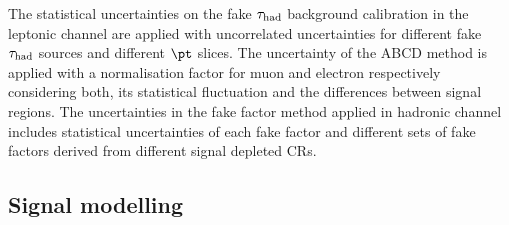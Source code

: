 \documentclass[PAPER, coverpage, atlasdraft=true, texlive=2016, UKenglish]{\ATLASLATEXPATH atlasdoc}
\providecommand{\DIFadd}[1]{{\protect\color{blue}\uwave{#1}}} %
\providecommand{\DIFdel}[1]{{\protect\color{red}\sout{#1}}}                      %
\providecommand{\DIFaddbegin}{} %
\providecommand{\DIFaddend}{} %
\providecommand{\DIFdelbegin}{} %
\providecommand{\DIFdelend}{} %
\begin{document}




The statistical uncertainties on the fake \DIFdelbegin \DIFdel{$\tau_{\mathrm{had}}$ }\DIFdelend \DIFaddbegin \DIFadd{tau }\DIFaddend background calibration in the leptonic channel are applied with uncorrelated uncertainties for different fake \DIFdelbegin \DIFdel{$\tau_{\mathrm{had}}$ }\DIFdelend \DIFaddbegin \DIFadd{tau }\DIFaddend sources and
different $\pt$ slices. The uncertainty of the ABCD method is applied with a normalisation factor for muon and electron respectively considering both,
its statistical fluctuation and the differences between signal regions.
The uncertainties in the fake factor method applied in hadronic channel includes statistical uncertainties of each fake factor and different sets of fake factors derived from different signal depleted CRs.

\subsection{Signal modelling}
\label{sec:syst_sigmodeling}
\end{document}
